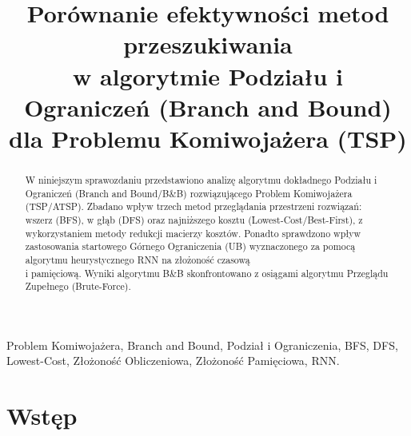 \documentclass[conference]{IEEEtran}
\begin{document}
    
    \title{Porównanie efektywności metod przeszukiwania\\w algorytmie Podziału i Ograniczeń (Branch and Bound) dla Problemu Komiwojażera (TSP)}
    \author{
        }
    \maketitle
    \thispagestyle{empty}
    \pagestyle{plain}


    \begin{abstract}
        W niniejszym sprawozdaniu przedstawiono analizę algorytmu dokładnego Podziału i Ograniczeń (Branch and Bound/B\&B) rozwiązującego Problem Komiwojażera (TSP/ATSP). Zbadano wpływ trzech metod przeglądania przestrzeni rozwiązań: wszerz (BFS), w głąb (DFS) oraz najniższego kosztu (Lowest-Cost/Best-First), z wykorzystaniem metody redukcji macierzy kosztów. Ponadto sprawdzono wpływ zastosowania startowego Górnego Ograniczenia (UB) wyznaczonego za pomocą algorytmu heurystycznego RNN na złożoność czasową\\i pamięciową. Wyniki algorytmu B\&B skonfrontowano z osiągami algorytmu Przeglądu Zupełnego (Brute-Force).
    \end{abstract}
    \begin{IEEEkeywords}
        Problem Komiwojażera, Branch and Bound, Podział i Ograniczenia, BFS, DFS, Lowest-Cost, Złożoność Obliczeniowa, Złożoność Pamięciowa, RNN.
    \end{IEEEkeywords}


    \section{Wstęp}
\end{document}
